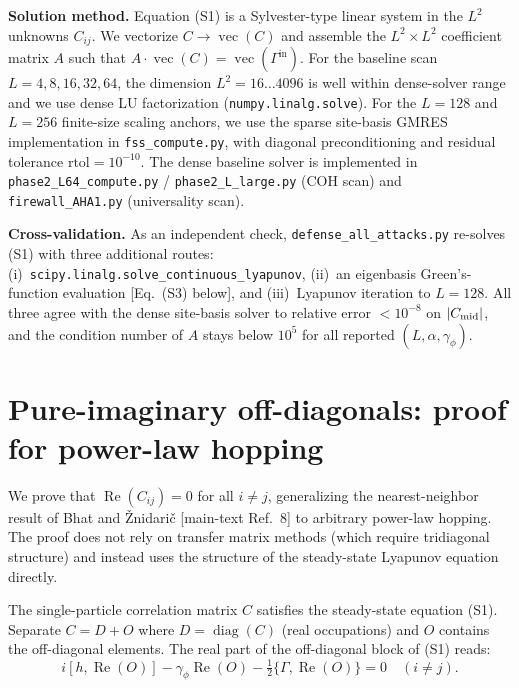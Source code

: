\documentclass[aps,prb,twocolumn,superscriptaddress]{revtex4-2}
\begin{document}
\textbf{Solution method.} Equation (S1) is a Sylvester-type linear system in the $L^2$ unknowns $C_{ij}$. We vectorize $C \to \operatorname{vec}(C)$ and assemble the $L^2 \times L^2$ coefficient matrix $A$ such that $A\cdot\operatorname{vec}(C) = \operatorname{vec}(\Gamma^{\text{in}})$. For the baseline scan $L = 4, 8, 16, 32, 64$, the dimension $L^2 = 16\ldots4096$ is well within dense-solver range and we use dense LU factorization (\texttt{numpy.linalg.solve}). For the $L=128$ and $L=256$ finite-size scaling anchors, we use the sparse site-basis GMRES implementation in \texttt{fss\_compute.py}, with diagonal preconditioning and residual tolerance $\text{rtol} = 10^{-10}$. The dense baseline solver is implemented in \texttt{phase2\_L64\_compute.py} / \texttt{phase2\_L\_large.py} (COH scan) and \texttt{firewall\_AHA1.py} (universality scan).

\textbf{Cross-validation.} As an independent check, \texttt{defense\_all\_attacks.py} re-solves (S1) with three additional routes: (i)~\texttt{scipy.linalg.solve\_continuous\_lyapunov}, (ii)~an eigenbasis Green's-function evaluation [Eq.~(S3) below], and (iii)~Lyapunov iteration to $L = 128$. All three agree with the dense site-basis solver to relative error ${<}10^{-8}$ on $|C_{\rm mid}|$, and the condition number of $A$ stays below $10^5$ for all reported $(L, \alpha, \gamma_\phi)$.

\section{Pure-imaginary off-diagonals: proof for power-law hopping}
\label{sec:S2}

We prove that $\operatorname{Re}(C_{ij}) = 0$ for all $i \neq j$, generalizing the nearest-neighbor result of Bhat and \v{Z}nidari\v{c} [main-text Ref.~8] to arbitrary power-law hopping. The proof does not rely on transfer matrix methods (which require tridiagonal structure) and instead uses the structure of the steady-state Lyapunov equation directly.

The single-particle correlation matrix $C$ satisfies the steady-state equation (S1). Separate $C = D + O$ where $D = \operatorname{diag}(C)$ (real occupations) and $O$ contains the off-diagonal elements. The real part of the off-diagonal block of (S1) reads:
\begin{equation}
i[h, \operatorname{Re}(O)] - \gamma_\phi \operatorname{Re}(O) - \tfrac{1}{2}\{\Gamma, \operatorname{Re}(O)\} = 0 \quad (i \neq j).
\tag{S2}
\end{equation}
\end{document}
